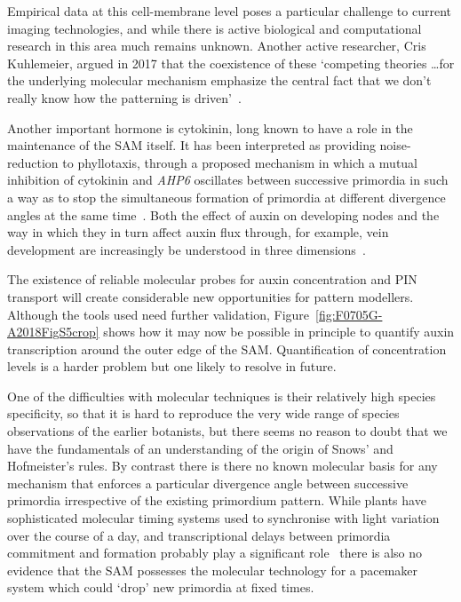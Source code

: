 Empirical data at this cell-membrane level poses a particular challenge  to current imaging technologies, and while there is active biological and computational research in this area much remains unknown. Another active researcher, Cris Kuhlemeier,  argued in 2017 that the coexistence of these `competing theories \ldots  for the underlying molecular mechanism emphasize the central fact that we don't really know how the patterning is driven'~\autocite{kuhlemeierPhyllotaxis2017}. 


Another important hormone is cytokinin, long known to have a role in the maintenance of the SAM itself. It has been interpreted as providing noise-reduction to phyllotaxis, through a proposed mechanism in which a mutual inhibition of cytokinin and \textit{AHP6} oscillates between successive primordia in such a way as to stop the simultaneous formation of primordia at different divergence angles at the same time~\cite{besnardCytokininSignallingInhibitory2014}. Both the effect of auxin on developing nodes and the way in which they in turn affect auxin flux through, for example, vein development are increasingly  be understood in three dimensions~\autocite{debPhyllotaxisInvolvesAuxin2015}.
 
The existence of reliable molecular probes for auxin concentration and PIN transport will create considerable new opportunities for pattern modellers. Although the tools used need further validation,  Figure~\ref{fig:F0705G-A2018FigS5crop} shows how it may now be possible in principle to quantify auxin transcription around the outer edge of the SAM. Quantification of concentration levels is a harder problem but one likely to resolve in future. %

One of the difficulties with molecular techniques is their relatively high species specificity, so that it is hard to reproduce the very wide range of species observations of the earlier botanists, but there seems no reason to doubt that we have the fundamentals of an understanding of the origin of Snows' and Hofmeister's rules. By contrast there is there no known molecular basis  for any mechanism that enforces a particular divergence angle between successive primordia irrespective of the existing primordium pattern. While plants have sophisticated molecular timing systems used to synchronise with light variation over the course of a day, and transcriptional  delays between primordia commitment and formation probably play a significant role~\autocite{galvan-ampudiaTemporalIntegrationAuxin2020}
 there is also no evidence that the SAM possesses the molecular technology for a pacemaker system which could `drop' new primordia at fixed times. 

